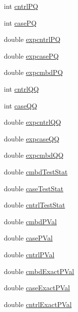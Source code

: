 \begin{DoxyCompactItemize}
int \hyperlink{structPopStatsResults_ac5937599cd6c59464c9e0fe6539b41f9}{cntrlPQ}
\item 
int \hyperlink{structPopStatsResults_a60d023691ccf07ffee079b98ebf01338}{casePQ}
\item 
double \hyperlink{structPopStatsResults_a8cdda9e3cc49b1c965441bbc1ad71229}{expcntrlPQ}
\item 
double \hyperlink{structPopStatsResults_a919273aead27ee71f552327c2e301ee5}{expcasePQ}
\item 
double \hyperlink{structPopStatsResults_a6d1d8f725f34b3e1bf8b22140ea486ab}{expcmbdPQ}
\item 
int \hyperlink{structPopStatsResults_ac31415ee243e11310bf6e434fa99409f}{cntrlQQ}
\item 
int \hyperlink{structPopStatsResults_ae7a1ca9cc75e1a6237b55b8bbb06c74f}{caseQQ}
\item 
double \hyperlink{structPopStatsResults_af88285c0bec88bf4f0a6925cba9652bc}{expcntrlQQ}
\item 
double \hyperlink{structPopStatsResults_aa256280f5cfba8b3c67c5e1a1f21917f}{expcaseQQ}
\item 
double \hyperlink{structPopStatsResults_a39fc583f882272982e2f7550b1ea1600}{expcmbdQQ}
\item 
double \hyperlink{structPopStatsResults_afd0e3d5db058098a131f807f24c8c72f}{cmbdTestStat}
\item 
double \hyperlink{structPopStatsResults_ad11807f478545154645038a829f6b193}{caseTestStat}
\item 
double \hyperlink{structPopStatsResults_a048f6b5f041e76ad337b96d4d5db7a62}{cntrlTestStat}
\item 
double \hyperlink{structPopStatsResults_a29931ad46e131cfdec21e647c9ac04af}{cmbdPVal}
\item 
double \hyperlink{structPopStatsResults_ac352f2bc013bf07a2c5a040c5d00dc93}{casePVal}
\item 
double \hyperlink{structPopStatsResults_a8e00f775bf534b982375ab39859c1de2}{cntrlPVal}
\item 
double \hyperlink{structPopStatsResults_a4232f6033cbac6b177f9a9ba8eb97863}{cmbdExactPVal}
\item 
double \hyperlink{structPopStatsResults_ae91841cf9427166ba755ab1350d4698b}{caseExactPVal}
\item 
double \hyperlink{structPopStatsResults_a9fe70b1314e54035181596d263ae10e0}{cntrlExactPVal}
\end{DoxyCompactItemize}


